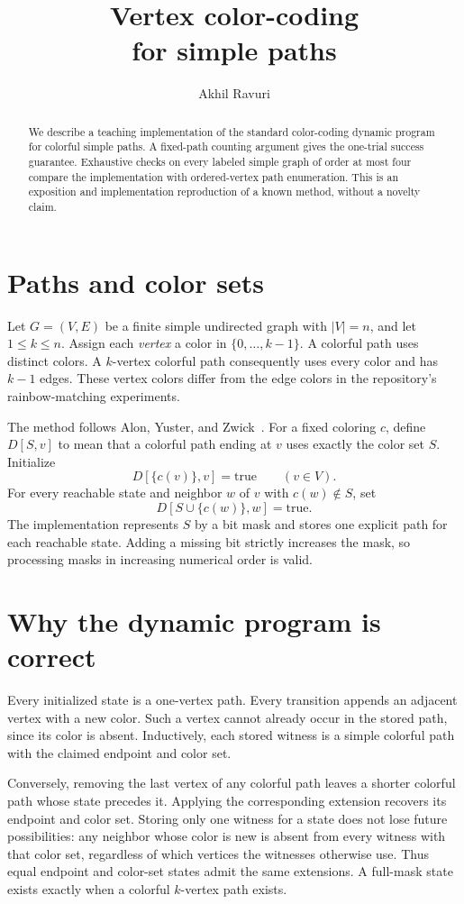 \documentclass[10pt,letterpaper]{article}
\title{\vspace{-1.5em}\LARGE\bfseries Vertex color-coding\\for simple paths}
\author{Akhil Ravuri}\date{}
\begin{document}
\maketitle\vspace{-1.5em}
\begin{abstract}
We describe a teaching implementation of the standard color-coding dynamic
program for colorful simple paths. A fixed-path counting argument gives the
one-trial success guarantee. Exhaustive checks on every labeled simple graph
of order at most four compare the implementation with ordered-vertex path
enumeration. This is an exposition and implementation reproduction of a known
method, without a novelty claim.
\end{abstract}

\section{Paths and color sets}
Let $G=(V,E)$ be a finite simple undirected graph with $|V|=n$, and let
$1\le k\le n$. Assign each \emph{vertex} a color in $\{0,\ldots,k-1\}$.
A colorful path uses distinct colors. A $k$-vertex colorful path consequently
uses every color and has $k-1$ edges. These vertex colors differ from the edge
colors in the repository's rainbow-matching experiments.

The method follows Alon, Yuster, and Zwick~\cite[Section 3 and Lemma 3.1]{AYZ}.
For a fixed coloring $c$, define $D[S,v]$ to mean that a colorful path ending
at $v$ uses exactly the color set $S$. Initialize
\[
 D[\{c(v)\},v]=\mathrm{true}\qquad(v\in V).
\]
For every reachable state and neighbor $w$ of $v$ with $c(w)\notin S$, set
\[
 D[S\cup\{c(w)\},w]=\mathrm{true}.
\]
The implementation represents $S$ by a bit mask and stores one explicit path
for each reachable state. Adding a missing bit strictly increases the mask,
so processing masks in increasing numerical order is valid.

\section{Why the dynamic program is correct}
Every initialized state is a one-vertex path. Every transition appends an
adjacent vertex with a new color. Such a vertex cannot already occur in the
stored path, since its color is absent. Inductively, each stored witness is a
simple colorful path with the claimed endpoint and color set.

Conversely, removing the last vertex of any colorful path leaves a shorter
colorful path whose state precedes it. Applying the corresponding extension
recovers its endpoint and color set. Storing only one witness for a state
does not lose future possibilities: any neighbor whose color is new is
absent from every witness with that color set, regardless of which vertices
the witnesses otherwise use. Thus equal endpoint and color-set states admit
the same extensions. A full-mask state exists exactly when a colorful
$k$-vertex path exists.
\end{document}
